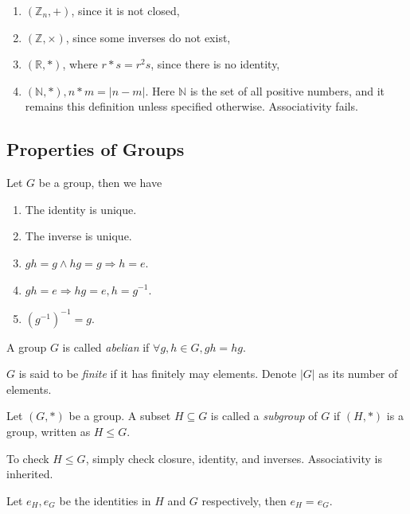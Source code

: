 \documentclass[a4paper]{article}
\begin{document}
\begin{example}
  \begin{enumerate}[(1)]
    \item $ (\mathbb{Z}_n, +) $, since it is not closed,
    \item $ (\mathbb{Z} , \times) $, since some inverses do not exist,
    \item $ (\mathbb{R} , *) $, where $ r*s = r^2 s $, since there is
      no identity,
    \item $ (\mathbb{N}, *), n*m = |n-m| $. Here $ \mathbb{N} $ is
      the set of all positive numbers, and it remains this definition
      unless specified otherwise. Associativity fails.
  \end{enumerate}
\end{example}
\subsection{Properties of Groups}
\begin{proposition}\label{prop:groups_properties}
  Let $G$ be a group, then we have
  \begin{enumerate}
    \item The identity is unique.
    \item The inverse is unique.
    \item $ gh=g \land hg=g \Rightarrow h=e $.
    \item $ gh=e \Rightarrow hg=e, h=g^{-1} $.
    \item $ (g^{-1})^{-1}=g $.
  \end{enumerate}
\end{proposition}
\begin{definition}
  A group $G$ is called \textit{abelian} if $ \forall g,h\in G, gh=hg $.
\end{definition}
\begin{definition}
  $G$ is said to be \textit{finite} if it has finitely may elements.
  Denote $|G|$ as its number of elements.
\end{definition}
\begin{definition}
  Let $ (G,*) $ be a group. A subset $H\subseteq G$ is called a
  \textit{subgroup} of $G$ if $ (H,*) $ is a group, written as $ H\le G $.
\end{definition}
\begin{remark}
  To check $ H\le G $, simply check closure, identity, and inverses.
  Associativity is inherited.
\end{remark}
\begin{proposition}\label{prop:uniqueness of identity}
  Let $ e_H, e_G $ be the identities in $H$ and $G$ respectively,
  then $e_H=e_G$.
\end{proposition}
\end{document}
